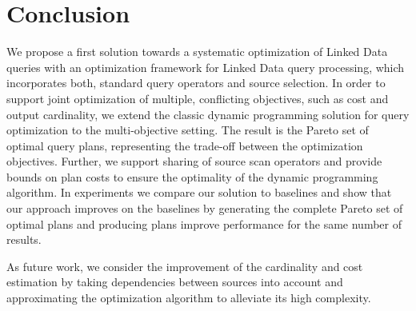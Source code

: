 \section{Conclusion}
\label{sec:conclusion}

We propose a first solution towards a systematic optimization of
Linked Data queries with an optimization framework for Linked Data
query processing, which incorporates both, standard query operators
and source selection. In order to support joint optimization of
multiple, conflicting objectives, such as cost and output cardinality,
we extend the classic dynamic programming solution for query
optimization to the multi-objective setting. The result is the Pareto
set of optimal query plans, representing the trade-off between the
optimization objectives. Further, we support sharing of source scan
operators and provide bounds on plan costs to ensure the optimality of
the dynamic programming algorithm. In experiments we compare our
solution to baselines and show that our approach improves on the
baselines by generating the complete Pareto set of optimal plans and
producing plans improve performance for the same number of results.

As future work, we consider the improvement of the cardinality and
cost estimation by taking dependencies between sources into account
and approximating the optimization algorithm to alleviate its high
complexity.

